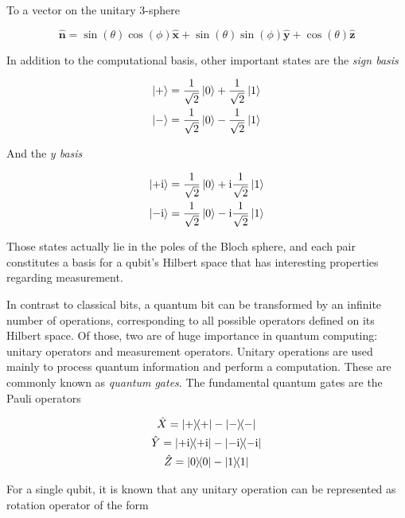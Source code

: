   To a vector on the unitary 3-sphere

  \begin{equation}
    \hat{\mathbf{n}} = \sin(\theta) \cos(\phi) \hat{\mathbf{x}}  + \sin(\theta) \sin(\phi)\hat{\mathbf{y}} + \cos(\theta) \hat{\mathbf{z}}
    \label{eq:bloch-vector}
  \end{equation}

  In addition to the computational basis, other important states are the \textit{sign basis}

  \begin{gather}
    \ket{+} = \frac{1}{\sqrt{2}}\ket{0} + \frac{1}{\sqrt{2}}\ket{1} \\
    \ket{-} = \frac{1}{\sqrt{2}}\ket{0} - \frac{1}{\sqrt{2}}\ket{1}
    \label{eq:sign-basis}
  \end{gather}

  And the \textit{y basis}

  \begin{gather}
    \ket{+\mathrm{i}} = \frac{1}{\sqrt{2}}\ket{0} + \mathrm{i}\frac{1}{\sqrt{2}}\ket{1} \\
    \ket{-\mathrm{i}} = \frac{1}{\sqrt{2}}\ket{0} - \mathrm{i}\frac{1}{\sqrt{2}}\ket{1}
    \label{eq:phase-basis}
  \end{gather}

  Those states actually lie in the poles of the Bloch sphere, and each pair constitutes a basis for a qubit's Hilbert space that has interesting properties regarding measurement.

  In contrast to classical bits, a quantum bit can be transformed by an infinite number of operations, corresponding to all possible operators defined on its Hilbert space. Of those, two are of huge importance in quantum computing: unitary operators and measurement operators. Unitary operations are used mainly to process quantum information and perform a computation. These are commonly known as \textit{quantum gates}. The fundamental quantum gates are the Pauli operators

  \begin{gather}
    \hat{X} = \ketbra{+}{+} - \ketbra{-}{-} \\
    \hat{Y} = \ketbra{+\mathrm{i}}{+\mathrm{i}} - \ketbra{-\mathrm{i}}{-\mathrm{i}} \\
    \hat{Z} = \ketbra{0}{0} - \ketbra{1}{1}
    \label{eq:pauli-ops}
  \end{gather}
  
  
  For a single qubit, it is known that any unitary operation can be represented as rotation operator of the form


